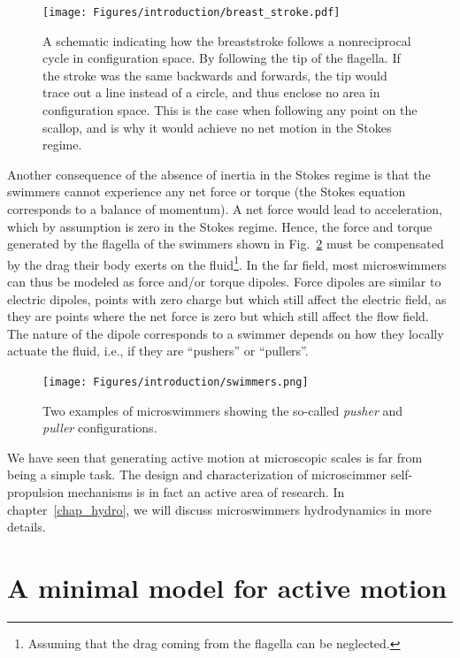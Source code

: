 \begin{figure}[!htb]
    \centering
    \texttt{[image: Figures/introduction/breast\_stroke.pdf]}
    \caption{
        A schematic indicating how the breaststroke follows a nonreciprocal cycle in configuration space.
    By following the tip of the flagella.
    If the stroke was the same backwards and forwards, the tip would trace out a line instead of a circle, and thus enclose no area in configuration space.
    This is the case when following any point on the scallop, and is why it would achieve no net motion in the Stokes regime. }
    \label{fig: breast stroke}
\end{figure}


Another consequence of the absence of inertia in the Stokes regime is that the swimmers cannot experience any net force or torque (the Stokes equation corresponds to a balance of momentum).
A net force would lead to acceleration, which by assumption is zero in the Stokes regime.
Hence, the force and torque generated by the flagella of the swimmers shown in Fig.~\ref{fig: swimmers} must be compensated by the drag their body exerts on the fluid\footnote{Assuming that the drag coming from the flagella can be neglected.}. 
In the far field, most microswimmers can thus be modeled as force and/or torque dipoles.
Force dipoles are similar to electric dipoles, points with zero charge but which still affect the electric field, as they are points where the net force is zero but which still affect the flow field.
The nature of the dipole corresponds to a swimmer depends on how they locally actuate the fluid, i.e., if they are ``pushers'' or ``pullers''.

\begin{figure}[!htb]
    \centering
    \texttt{[image: Figures/introduction/swimmers.png]}
    \caption{Two examples of microswimmers showing the so-called \textit{pusher} and \textit{puller} configurations.
    }
    \label{fig: swimmers}
\end{figure}

We have seen that generating active motion at microscopic scales is far from being a simple task. The design and characterization of microscimmer self-propulsion mechanisms is in fact an active area of research. 
In chapter~\ref{chap_hydro}, we will discuss microswimmers hydrodynamics in more details.


\section{A minimal model for active motion}
\label{intro_ABM}

